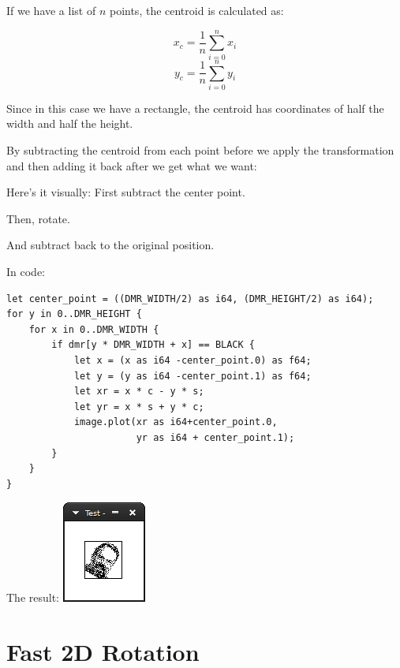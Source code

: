 \documentclass[12pt,openany,a4,usenames,dvipsnames]{book}
\begin{document}
If we have a list of $n$ points, the centroid is calculated as:

$$ x_c = \frac{1}{n}\sum_{i=0}^{n} x_i $$
$$ y_c = \frac{1}{n}\sum_{i=0}^{n} y_i $$

Since in this case we have a rectangle, the centroid has coordinates of half the width and half the height.

By subtracting the centroid from each point before we apply the transformation and then adding it back after we get what we want:

Here's it visually: First subtract the center point.

\begin{figure}[H]
\centering
\def\svgscale{0.6}

\end{figure}

Then, rotate.

\begin{figure}[H]
\centering
\def\svgscale{0.6}

\end{figure}

And subtract back to the original position.

\begin{figure}[H]
\centering
\def\svgscale{0.6}

\end{figure}

In code:

\begin{verbatim}
let center_point = ((DMR_WIDTH/2) as i64, (DMR_HEIGHT/2) as i64);
for y in 0..DMR_HEIGHT {
    for x in 0..DMR_WIDTH {
        if dmr[y * DMR_WIDTH + x] == BLACK {
            let x = (x as i64 -center_point.0) as f64;
            let y = (y as i64 -center_point.1) as f64;
            let xr = x * c - y * s;
            let yr = x * s + y * c;
            image.plot(xr as i64+center_point.0,
                       yr as i64 + center_point.1);
        }
    }
}
\end{verbatim}

The result: \includegraphics{figures/ch11-3.png}

\section{Fast 2D Rotation}
\skelpar%
\end{document}
